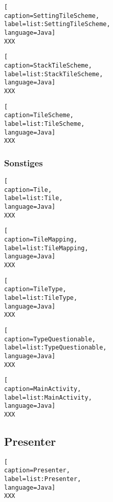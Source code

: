 \begin{lstlisting}[
caption=SettingTileScheme,
label=list:SettingTileScheme,
language=Java]
XXX
\end{lstlisting}    

\begin{lstlisting}[
caption=StackTileScheme,
label=list:StackTileScheme,
language=Java]
XXX
\end{lstlisting}    

\begin{lstlisting}[
caption=TileScheme,
label=list:TileScheme,
language=Java]
XXX
\end{lstlisting}

\subsubsection{Sonstiges}

\begin{lstlisting}[
caption=Tile,
label=list:Tile,
language=Java]
XXX
\end{lstlisting}    

\begin{lstlisting}[
caption=TileMapping,
label=list:TileMapping,
language=Java]
XXX
\end{lstlisting}    

\begin{lstlisting}[
caption=TileType,
label=list:TileType,
language=Java]
XXX
\end{lstlisting}    

\begin{lstlisting}[
caption=TypeQuestionable,
label=list:TypeQuestionable,
language=Java]
XXX
\end{lstlisting}    

\begin{lstlisting}[
caption=MainActivity,
label=list:MainActivity,
language=Java]
XXX
\end{lstlisting} 

\subsection{Presenter}

\begin{lstlisting}[
caption=Presenter,
label=list:Presenter,
language=Java]
XXX
\end{lstlisting}    